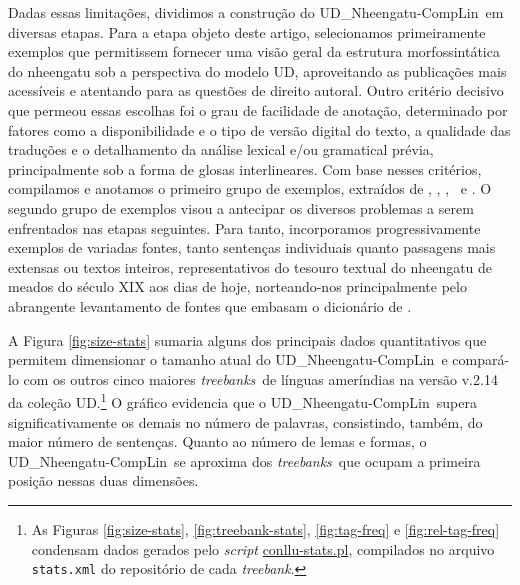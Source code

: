 \documentclass[portuguese]{textolivre}
\newcommand{\udc}{coleção UD}
\newcommand{\tbc}{UD\_Nheengatu-CompLin}
\newcommand{\tbs}{\textit{treebanks}}
\newcommand{\tb}{\textit{treebank}}
\newcommand{\vum}{\textcite{alencar2021}}
\begin{document}
Dadas essas limitações, dividimos a construção do \tbc~em diversas etapas. Para a etapa objeto deste artigo, selecionamos primeiramente exemplos que permitissem fornecer uma visão geral da estrutura morfossintática do nheengatu sob a perspectiva do modelo UD, aproveitando as publicações mais acessíveis e atentando para as questões de direito autoral. Outro critério decisivo que permeou essas escolhas foi o grau de facilidade de anotação, determinado por fatores como a disponibilidade e o tipo de versão digital do texto, a qualidade das traduções e o detalhamento da análise lexical e/ou gramatical prévia, principalmente sob a forma de glosas interlineares. Com base nesses critérios, compilamos e anotamos o primeiro grupo de exemplos, extraídos de \textcite{moore-facundes-pires-1994}, \textcite{cruz2011}, \textcite{navarro2016}, \vum~e \textcite{avila2021}. O segundo grupo de exemplos visou a antecipar os diversos problemas a serem enfrentados nas etapas seguintes. Para tanto, incorporamos progressivamente exemplos de variadas fontes, tanto sentenças individuais quanto passagens mais extensas ou textos inteiros, representativos do tesouro textual do nheengatu de meados do século XIX aos dias de hoje, norteando-nos principalmente pelo abrangente levantamento de fontes que embasam o dicionário de \textcite{avila2021}. 

A Figura \ref{fig:size-stats} sumaria alguns dos principais dados quantitativos que permitem dimensionar o tamanho atual do \tbc~e compará-lo com os outros cinco maiores \tbs~de línguas ameríndias na versão v.2.14 da \udc.\footnote{As Figuras \ref{fig:size-stats}, \ref{fig:treebank-stats}, \ref{fig:tag-freq} e \ref{fig:rel-tag-freq} condensam dados gerados pelo \textit{script} \href{https://github.com/UniversalDependencies/tools/blob/master/conllu-stats.pl}{conllu-stats.pl}, compilados no arquivo \texttt{stats.xml} do repositório de cada \tb.} O gráfico evidencia que o \tbc~supera significativamente os demais no número de palavras, consistindo, também, do maior número de sentenças. Quanto ao número de lemas e formas, o \tbc~se aproxima dos \tbs~que ocupam a primeira posição nessas duas dimensões.
\end{document}
